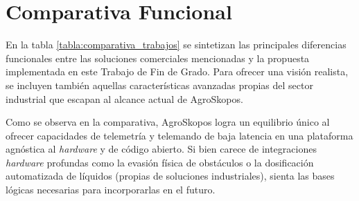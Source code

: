 \section{Comparativa Funcional}

En la tabla \ref{tabla:comparativa_trabajos} se sintetizan las principales diferencias funcionales entre las soluciones comerciales mencionadas y la propuesta implementada en este Trabajo de Fin de Grado. Para ofrecer una visión realista, se incluyen también aquellas características avanzadas propias del sector industrial que escapan al alcance actual de AgroSkopos.

\begin{table}[!h]
 \begin{center}
  \caption{Comparativa de características entre plataformas}
  \label{tabla:comparativa_trabajos}
 \end{center}
\end{table}

Como se observa en la comparativa, AgroSkopos logra un equilibrio único al ofrecer capacidades de telemetría y telemando de baja latencia en una plataforma agnóstica al \textit{hardware} y de código abierto. Si bien carece de integraciones \textit{hardware} profundas como la evasión física de obstáculos o la dosificación automatizada de líquidos (propias de soluciones industriales), sienta las bases lógicas necesarias para incorporarlas en el futuro.
